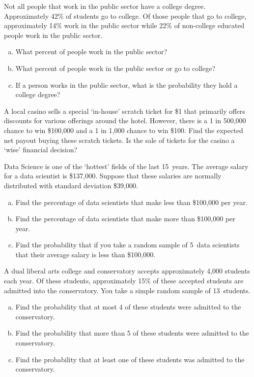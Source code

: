 \documentclass[12pt,letterpaper]{exam}
\begin{document}
\begin{questions}
\newpage
\question[10] Not all people that work in the public sector have a college degree. Approximately 42\% of students go to college. Of those people that go to college, approximately 14\% work in the public sector while 22\% of non-college educated people work in the public sector. 
	\begin{enumerate}[(a)]
	\item What percent of people work in the public sector?
	\item What percent of people work in the public sector or go to college?
	\item If a person works in the public sector, what is the probability they hold a college degree?
	\end{enumerate}



\newpage
\question[10] A local casino sells a special `in-house' scratch ticket for \$1 that primarily offers discounts for various offerings around the hotel. However, there is a 1 in 500,000 chance to win \$100,000 and a 1 in 1,000 chance to win \$100. Find the expected net payout buying these scratch tickets. Is the sale of tickets for the casino a `wise' financial decision? 



\newpage
\question[15] Data Science is one of the `hottest' fields of the last 15~years. The average salary for a data scientist is \$137,000. Suppose that these salaries are normally distributed with standard deviation \$39,000. 
	\begin{enumerate}[(a)]
	\item Find the percentage of data scientists that make less than \$100,000 per year.
	\item Find the percentage of data scientists that make more than \$100,000 per year.
	\item Find the probability that if you take a random sample of 5~data scientists that their average salary is less than \$100,000.  
	\end{enumerate}



\newpage
\question[10] A dual liberal arts college and conservatory accepts approximately 4,000 students each year. Of these students, approximately 15\% of these accepted students are admitted into the conservatory. You take a simple random sample of 13~students.
	\begin{enumerate}[(a)]
	\item Find the probability that at most 4 of these students were admitted to the conservatory. 
	\item Find the probability that more than 5 of these students were admitted to the conservatory. 
	\item Find the probability that at least one of these students was admitted to the conservatory. 
	\end{enumerate}




\end{questions}
\end{document}
